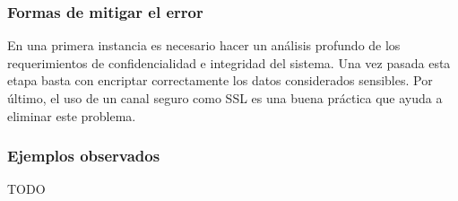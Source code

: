 \subsubsection{Formas de mitigar el error}

En una primera instancia es necesario hacer un análisis profundo de los requerimientos de confidencialidad e integridad del sistema.
Una vez pasada esta etapa basta con encriptar correctamente los datos considerados sensibles.
Por último, el uso de un canal seguro como SSL es una buena práctica que ayuda a eliminar este problema.


\subsubsection{Ejemplos observados}

TODO
